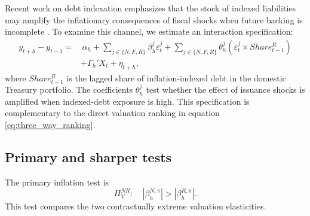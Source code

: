 \documentclass[12pt,a4paper]{article}
\begin{document}
Recent work on debt indexation emphasizes that the stock of indexed liabilities may amplify the inflationary consequences of fiscal shocks when future backing is incomplete \citep{Kawalec2025}. To examine this channel, we estimate an interaction specification:
\begin{align}
y_{t+h}-y_{t-1}
=&\,
\alpha_h
+
\sum_{j\in\{N,F,R\}}
\beta_h^j\varepsilon_t^j
+
\sum_{j\in\{N,F,R\}}
\theta_h^j
\left(
\varepsilon_t^j \times Share_{t-1}^{R}
\right)
\nonumber\\
&+
\Gamma_h'X_t
+
\eta_{t+h},
\label{eq:lp_indexed_share}
\end{align}
where \(Share_{t-1}^{R}\) is the lagged share of inflation-indexed debt in the domestic Treasury portfolio. The coefficients \(\theta_h^j\) test whether the effect of issuance shocks is amplified when indexed-debt exposure is high. This specification is complementary to the direct valuation ranking in equation \eqref{eq:three_way_ranking}.

%
%

\subsection{Primary and sharper tests}

The primary inflation test is
\begin{equation}
H_{V}^{NR}:\quad |\beta_h^{N,\pi}|>|\beta_h^{R,\pi}|.
\label{eq:test_nr}
\end{equation}
This test compares the two contractually extreme valuation elasticities.
\end{document}
